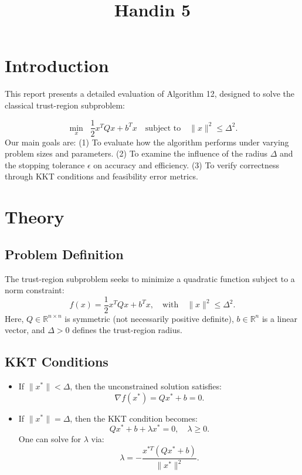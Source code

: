 \documentclass[12pt]{article}
\title{Handin 5}
\begin{document}
\maketitle

\section{Introduction}


This report presents a detailed evaluation of Algorithm 12, designed to solve the classical trust-region subproblem:

\[
\min_{x} \;\; \frac{1}{2} x^T Q x + b^T x \quad \text{subject to} \quad \|x\|^2 \leq \Delta^2.
\]
Our main goals are: (1) To evaluate how the algorithm performs under varying problem sizes and parameters. (2) To examine the influence of the radius $\Delta$ and the stopping tolerance $\epsilon$ on accuracy and efficiency. (3) To verify correctness through KKT conditions and feasibility error metrics.

\section{Theory}


\subsection{Problem Definition}
The trust-region subproblem seeks to minimize a quadratic function subject to a norm constraint:
\[
f(x) = \frac{1}{2} x^T Q x + b^T x, \quad \text{with} \quad \|x\|^2 \leq \Delta^2.
\]
Here, $Q \in \mathbb{R}^{n \times n}$ is symmetric (not necessarily positive definite), $b \in \mathbb{R}^n$ is a linear vector, and $\Delta > 0$ defines the trust-region radius.
\subsection{KKT Conditions}
\begin{itemize}
    \item If $\|x^*\| < \Delta$, then the unconstrained solution satisfies:
    \[
    \nabla f(x^*) = Qx^* + b = 0.
    \]
    
    \item If $\|x^*\| = \Delta$, then the KKT condition becomes:
    \[
    Qx^* + b + \lambda x^* = 0, \quad \lambda \geq 0.
    \]
    One can solve for $\lambda$ via:
    \[
    \lambda = -\frac{x^{*T}(Qx^* + b)}{\|x^*\|^2}.
    \]
\end{itemize}
\end{document}

